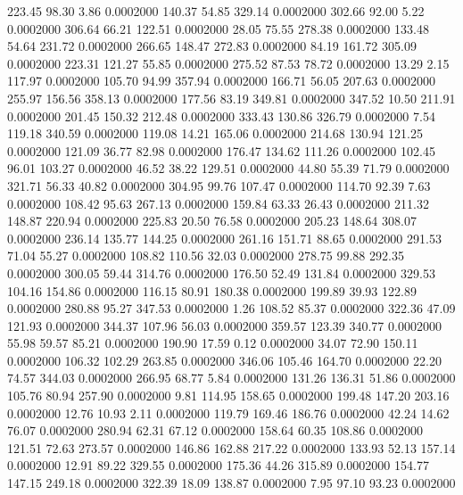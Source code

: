  223.45   98.30    3.86   0.0002000
 140.37   54.85  329.14   0.0002000
 302.66   92.00    5.22   0.0002000
 306.64   66.21  122.51   0.0002000
  28.05   75.55  278.38   0.0002000
 133.48   54.64  231.72   0.0002000
 266.65  148.47  272.83   0.0002000
  84.19  161.72  305.09   0.0002000
 223.31  121.27   55.85   0.0002000
 275.52   87.53   78.72   0.0002000
  13.29    2.15  117.97   0.0002000
 105.70   94.99  357.94   0.0002000
 166.71   56.05  207.63   0.0002000
 255.97  156.56  358.13   0.0002000
 177.56   83.19  349.81   0.0002000
 347.52   10.50  211.91   0.0002000
 201.45  150.32  212.48   0.0002000
 333.43  130.86  326.79   0.0002000
   7.54  119.18  340.59   0.0002000
 119.08   14.21  165.06   0.0002000
 214.68  130.94  121.25   0.0002000
 121.09   36.77   82.98   0.0002000
 176.47  134.62  111.26   0.0002000
 102.45   96.01  103.27   0.0002000
  46.52   38.22  129.51   0.0002000
  44.80   55.39   71.79   0.0002000
 321.71   56.33   40.82   0.0002000
 304.95   99.76  107.47   0.0002000
 114.70   92.39    7.63   0.0002000
 108.42   95.63  267.13   0.0002000
 159.84   63.33   26.43   0.0002000
 211.32  148.87  220.94   0.0002000
 225.83   20.50   76.58   0.0002000
 205.23  148.64  308.07   0.0002000
 236.14  135.77  144.25   0.0002000
 261.16  151.71   88.65   0.0002000
 291.53   71.04   55.27   0.0002000
 108.82  110.56   32.03   0.0002000
 278.75   99.88  292.35   0.0002000
 300.05   59.44  314.76   0.0002000
 176.50   52.49  131.84   0.0002000
 329.53  104.16  154.86   0.0002000
 116.15   80.91  180.38   0.0002000
 199.89   39.93  122.89   0.0002000
 280.88   95.27  347.53   0.0002000
   1.26  108.52   85.37   0.0002000
 322.36   47.09  121.93   0.0002000
 344.37  107.96   56.03   0.0002000
 359.57  123.39  340.77   0.0002000
  55.98   59.57   85.21   0.0002000
 190.90   17.59    0.12   0.0002000
  34.07   72.90  150.11   0.0002000
 106.32  102.29  263.85   0.0002000
 346.06  105.46  164.70   0.0002000
  22.20   74.57  344.03   0.0002000
 266.95   68.77    5.84   0.0002000
 131.26  136.31   51.86   0.0002000
 105.76   80.94  257.90   0.0002000
   9.81  114.95  158.65   0.0002000
 199.48  147.20  203.16   0.0002000
  12.76   10.93    2.11   0.0002000
 119.79  169.46  186.76   0.0002000
  42.24   14.62   76.07   0.0002000
 280.94   62.31   67.12   0.0002000
 158.64   60.35  108.86   0.0002000
 121.51   72.63  273.57   0.0002000
 146.86  162.88  217.22   0.0002000
 133.93   52.13  157.14   0.0002000
  12.91   89.22  329.55   0.0002000
 175.36   44.26  315.89   0.0002000
 154.77  147.15  249.18   0.0002000
 322.39   18.09  138.87   0.0002000
   7.95   97.10   93.23   0.0002000
